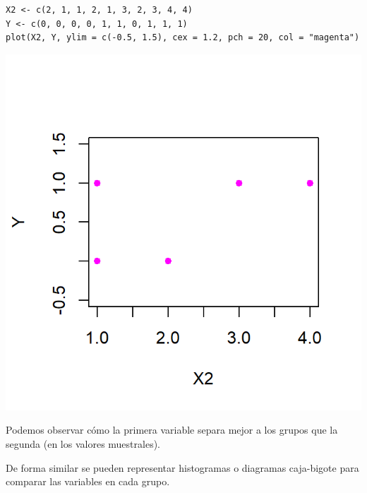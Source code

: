 \begin{minipage}{0.48\textwidth}
\end{minipage}\qquad\begin{minipage}{0.48\textwidth}
\begin{lstlisting}
X2 <- c(2, 1, 1, 2, 1, 3, 2, 3, 4, 4)
Y <- c(0, 0, 0, 0, 1, 1, 0, 1, 1, 1)
plot(X2, Y, ylim = c(-0.5, 1.5), cex = 1.2, pch = 20, col = "magenta")
\end{lstlisting}
\begin{center}
	\includegraphics[width=\linewidth]{"Temas/Imágenes/Tema 3/screenshot006"}
\end{center}

\end{minipage}

Podemos observar cómo la primera variable separa mejor a los grupos que la segunda (en los valores muestrales).

De forma similar se pueden representar histogramas o diagramas caja-bigote para comparar las variables en cada grupo.

